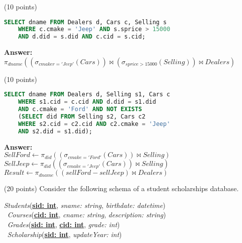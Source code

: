 \begin{questions}
\begin{choices}

    \choice (10 points)
    \begin{lstlisting}[language=SQL]
    SELECT dname FROM Dealers d, Cars c, Selling s
    WHERE c.cmake = 'Jeep' AND s.sprice > 15000 
    AND d.did = s.did AND c.cid = s.cid;
    \end{lstlisting}
    \textbf{Answer:} \\
    $\pi_{dname}((\sigma_{cmaker='Jeep'}(Cars))\bowtie(\sigma_{sprice>15000}(Selling))\bowtie Dealers)$
    

    \choice (10 points)
    \begin{lstlisting}[language=SQL]
    SELECT dname FROM Dealers d, Selling s1, Cars c
    WHERE s1.cid = c.cid AND d.did = s1.did 
    AND c.cmake = 'Ford' AND NOT EXISTS 
    (SELECT did FROM Selling s2, Cars c2
    WHERE s2.cid = c2.cid AND c2.cmake = 'Jeep' 
    AND s2.did = s1.did);
    \end{lstlisting}
    \textbf{Answer:} \\
    $SellFord\leftarrow \pi_{did}((\sigma_{cmake='Ford'}(Cars))\bowtie Selling)$ \\
    $SellJeep\leftarrow \pi_{did}((\sigma_{cmake='Jeep'}(Cars))\bowtie Selling)$ \\
    $Result\leftarrow \pi_{dname}((sellFord - sellJeep)\bowtie Dealers)$
    
\end{choices}


\question (20 points) Consider the following schema of a student scholarships database.\\
\begin{addmargin}[1em]{2em}%

    \textit{Students}(\textbf{\underline{sid: int}},  \textit{sname: string}, \textit{birthdate: datetime})\\\
    \textit{Courses}(\textbf{\underline{cid: int}},  \textit{cname: string}, \textit{description: string})\\\
    \textit{Grades}(\textbf{\underline{sid: int}}, \textbf{\underline{cid: int}}, \textit{grade: int})\\\
    \textit{Scholarship}(\textbf{\underline{sid: int}}, \textit{updateYear: int})\\\
    

\end{addmargin}
\end{questions}

